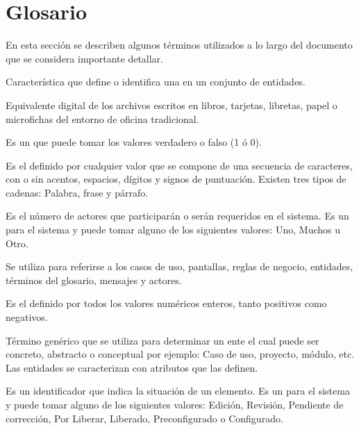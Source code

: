 \section{Glosario}
\label{sec:glosario}
    En esta sección se describen algunos términos utilizados a lo largo del documento que se considera importante detallar. 
  
\begin{description}
	 Característica que define o identifica una  en un conjunto de entidades.

	 Equivalente digital de los archivos escritos en libros, tarjetas, libretas, papel o microfichas del entorno de oficina tradicional.

	 Es un  que puede tomar los valores verdadero o falso (1 ó 0).
	
	 Es el  definido por cualquier valor que se compone de una secuencia de caracteres, con o sin acentos, espacios, dígitos y 
	signos de puntuación. Existen tres tipos de cadenas: Palabra, frase y párrafo.
	
	 Es el número de actores que participarán o serán requeridos en el sistema. Es un  para el sistema y puede tomar alguno de los siguientes valores:
	Uno, Muchos u Otro.

	 Se utiliza para referirse a los casos de uso, pantallas, reglas de negocio, entidades, términos del glosario, mensajes y actores.
	
	 Es el   definido por todos los valores numéricos enteros, tanto positivos como negativos.
	
	 Término genérico que se utiliza para determinar un ente el cual puede ser concreto, abstracto o conceptual por ejemplo: Caso de uso, 
		proyecto, módulo, etc. Las entidades se caracterizan con atributos que las definen.		
		
	 Es un identificador que indica la situación de un elemento. Es un  para el sistema y puede tomar alguno de los siguientes valores:
	Edición, Revisión, Pendiente de corrección, Por Liberar, Liberado, Preconfigurado o Configurado.
	

\end{description}
